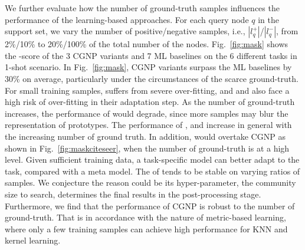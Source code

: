 We further evaluate how the number of ground-truth samples influences
the performance of the learning-based approaches.
%
For each query node $q$ in the support set, we vary the number of
positive/negative samples, i.e., $|l_q^{+}|$/$|l_q^{-}|$,
from 2\%/10\% to 20\%/100\% of the total number of the nodes.
Fig.~\ref{fig:mask} shows the \Fone-score of the 3 CGNP variants and 7
ML baselines on the 6 different tasks in 1-shot scenario.  In
Fig.~\ref{fig:mask}, CGNP variants surpass the ML baselines by 30\% on
average, particularly under the circumstances of the scarce
ground-truth. For small training samples, \Supervise suffers from
severe over-fitting, and \Featrans and \PN also face a high risk of
over-fitting in their adaptation step.  As the number of ground-truth
increases, the performance of \PN would degrade, since more samples
may blur the representation of prototypes.  The performance of \MAML, \Reptile and \AQDGNN increase in general with the increasing number of ground
truth. In addition, \Supervise would overtake CGNP as shown in
Fig.~\ref{fig:maskciteseer}, when the number of ground-truth is at a
high level.  Given sufficient training data, a task-specific
\Supervise model can better adapt to the task, compared with a
meta model.
%
The \Fone of \ICSGNN tends to be stable on varying ratios of
samples. We conjecture the reason could be its hyper-parameter, the
community size to search, determines the final results in the
post-processing stage.
%
Furthermore, we find that the performance of CGNP is robust to the
number of ground-truth. That is in accordance with the nature of
metric-based learning, where only a few training samples can achieve
high performance for KNN and kernel learning.








